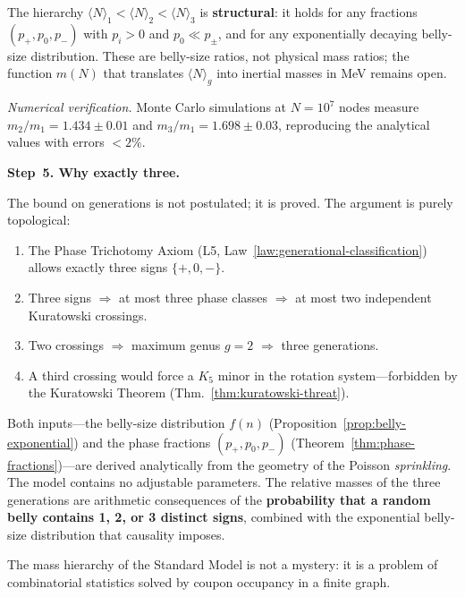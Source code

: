 \noindent
The hierarchy $\langle N\rangle_1 < \langle N\rangle_2 <
\langle N\rangle_3$ is \textbf{structural}: it holds for any fractions
$(p_+, p_0, p_-)$ with $p_i > 0$ and $p_0 \ll p_\pm$, and for any
exponentially decaying belly-size distribution. These are belly-size
ratios, not physical mass ratios; the function $m(N)$ that translates
$\langle N\rangle_g$ into inertial masses in MeV remains open.

\medskip
\noindent\textit{Numerical verification.}\enspace
Monte Carlo simulations at $N = 10^7$ nodes measure
$m_2/m_1 = 1{.}434 \pm 0{.}01$ and
$m_3/m_1 = 1{.}698 \pm 0{.}03$, reproducing the analytical values with
errors $< 2\%$.

\bigskip
\noindent
\textbf{Step~5. Why exactly three.}

The bound on generations is not postulated; it is proved. The argument is
purely topological:
\begin{enumerate}
  \item The Phase Trichotomy Axiom
        (L5, Law~\ref{law:generational-classification}) allows exactly three signs
        $\{+, 0, -\}$.
  \item Three signs $\Longrightarrow$ at most three phase classes
        $\Longrightarrow$ at most two independent Kuratowski crossings.
  \item Two crossings $\Longrightarrow$ maximum genus $g = 2$
        $\Longrightarrow$ three generations.
  \item A third crossing would force a $K_5$ minor in the rotation
        system---forbidden by the Kuratowski Theorem
        (Thm.~\ref{thm:kuratowski-threat}).
\end{enumerate}

\begin{result}[title={Inventory: zero free parameters}]
Both inputs---the belly-size distribution $f(n)$
(Proposition~\ref{prop:belly-exponential}) and the phase fractions
$(p_+, p_0, p_-)$
(Theorem~\ref{thm:phase-fractions})---are derived analytically from the
geometry of the Poisson \emph{sprinkling}. The model contains no
adjustable parameters. The relative masses of the three generations are
arithmetic consequences of the \textbf{probability that a random belly
contains 1, 2, or 3 distinct signs}, combined with the exponential
belly-size distribution that causality imposes.

The mass hierarchy of the Standard Model is not a mystery: it is a
problem of combinatorial statistics solved by coupon occupancy in a
finite graph.
\end{result}

